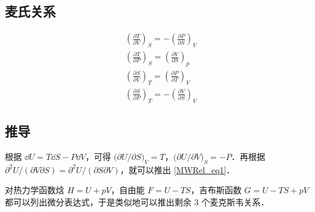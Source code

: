 

\subsection{麦氏关系}

\begin{align}
&\left(\frac{\partial T}{\partial V}\right)_S=-\left(\frac{\partial P}{\partial S}\right)_V\label{MWRel_eq1}
\\
&\left(\frac{\partial T}{\partial P}\right)_S=\left(\frac{\partial V}{\partial S}\right)_p
\\
&\left(\frac{\partial S}{\partial V}\right)_T=\left(\frac{\partial P}{\partial T}\right)_V
\\
&\left(\frac{\partial S}{\partial P}\right)_T=-\left(\frac{\partial V}{\partial S}\right)_V
\end{align}

\subsection{推导}
根据 $\dd U=T\dd S-P\dd V$，可得 $\Big(\partial U/\partial S\Big)_V=T$，$\Big(\partial U/\partial V\Big)_S=-P$．再根据 $\partial^2 U/(\partial V\partial S)=\partial^2 U/(\partial S\partial V)$，就可以推出 \autoref{MWRel_eq1}．

对热力学函数焓 $H=U+pV$，自由能 $F=U-TS$，吉布斯函数 $G=U-TS+pV$ 都可以列出微分表达式，于是类似地可以推出剩余 $3$ 个麦克斯韦关系．

